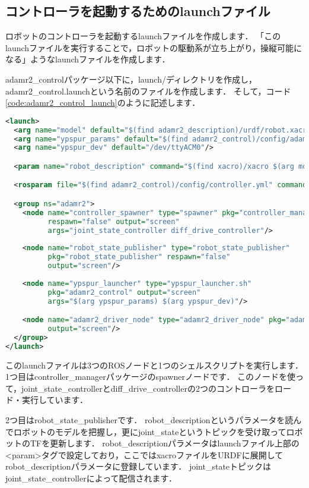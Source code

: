 \documentclass[{../../master}]{subfiles}
\begin{document}
\subsection{コントローラを起動するためのlaunchファイル}

ロボットのコントローラを起動するlaunchファイルを作成します．
「このlaunchファイルを実行することで，ロボットの駆動系が立ち上がり，操縦可能になる」ようなlaunchファイルを作成します．

\textsf{adamr2\_control}パッケージ以下に，\textsf{launch/}ディレクトリを作成し，\textsf{adamr2\_control.launch}という名前のファイルを作成します．
そして，コード\ref{code:adamr2_control_launch}のように記述します．

\begin{lstlisting}[language=XML, label=code:adamr2_control_launch, caption=\textsf{adamr2\_control.launch}]
<launch>
  <arg name="model" default="$(find adamr2_description)/urdf/robot.xacro"/>
  <arg name="ypspur_params" default="$(find adamr2_control)/config/adamr2.param"/>
  <arg name="ypspur_dev" default="/dev/ttyACM0"/>

  <param name="robot_description" command="$(find xacro)/xacro $(arg model)"/>

  <rosparam file="$(find adamr2_control)/config/controller.yml" command="load"/>

  <group ns="adamr2">
    <node name="controller_spawner" type="spawner" pkg="controller_manager"
          respawn="false" output="screen"
          args="joint_state_controller diff_drive_controller"/>
    
    <node name="robot_state_publisher" type="robot_state_publisher"
          pkg="robot_state_publisher" respawn="false"
          output="screen"/>
    
    <node name="ypspur_launcher" type="ypspur_launcher.sh"
          pkg="adamr2_control" output="screen"
          args="$(arg ypspur_params) $(arg ypspur_dev)"/>

    <node name="adamr2_driver_node" type="adamr2_driver_node" pkg="adamr2_driver"
          output="screen"/>
  </group>
</launch>
\end{lstlisting}

このlaunchファイルは3つのROSノードと1つのシェルスクリプトを実行します．
1つ目は\textsf{controller\_manager}パッケージの\textsf{spawner}ノードです．
このノードを使って，\textsf{joint\_state\_controller}と\textsf{diff\_drive\_controller}の2つのコントローラをロード・実行しています．

2つ目は\textsf{robot\_state\_publisher}です．
\textsf{robot\_description}というパラメータを読んでロボットのモデルを把握し，更に\textsf{joint\_state}というトピックを受け取ってロボットのTFを更新します．
\textsf{robot\_description}パラメータはlaunchファイル上部の\textsf{<param>}タグで設定しており，ここではxacroファイルをURDFに展開して\textsf{robot\_description}パラメータに登録しています．
\textsf{joint\_state}トピックは\textsf{joint\_state\_controller}によって配信されます．
\end{document}

